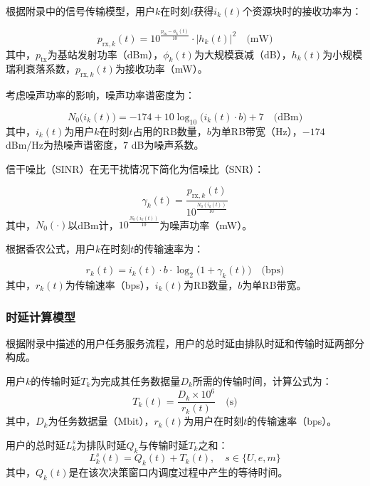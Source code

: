 根据附录中的信号传输模型，用户$k$在时刻$t$获得$i_k(t)$个资源块时的接收功率为：

\begin{equation}
p_{\text{rx},k}(t) = 10^{\frac{p_{\text{tx}} - \phi_k(t)}{10}} \cdot |h_k(t)|^2 \quad \text{(mW)}
\end{equation}
其中，$p_{\text{tx}}$为基站发射功率（dBm），$\phi_k(t)$为大规模衰减（dB），$h_k(t)$为小规模瑞利衰落系数，$p_{\text{rx},k}(t)$为接收功率（mW）。

考虑噪声功率的影响，噪声功率谱密度为：

\begin{equation}
N_0\big(i_k(t)\big) = -174 + 10\log_{10}\big(i_k(t) \cdot b\big) + 7 \quad \text{(dBm)}
\end{equation}
其中，$i_k(t)$为用户$k$在时刻$t$占用的RB数量，$b$为单RB带宽（Hz），$-174$ dBm/Hz为热噪声谱密度，$7$ dB为噪声系数。

信干噪比（SINR）在无干扰情况下简化为信噪比（SNR）：

\begin{equation}
\gamma_k(t) = \frac{p_{\text{rx},k}(t)}{10^{\frac{N_0\left(i_k(t)\right)}{10}}}
\end{equation}
其中，$N_0(\cdot)$以dBm计，$10^{\frac{N_0\left(i_k(t)\right)}{10}}$为噪声功率（mW）。

根据香农公式，用户$k$在时刻$t$的传输速率为：

\begin{equation}
r_k(t) = i_k(t) \cdot b \cdot \log_2\big(1 + \gamma_k(t)\big) \quad \text{(bps)}
\end{equation}
其中，$r_k(t)$为传输速率（bps），$i_k(t)$为RB数量，$b$为单RB带宽。

\subsubsection{时延计算模型}
根据附录中描述的用户任务服务流程，用户的总时延由排队时延和传输时延两部分构成。

用户$k$的传输时延$T_k$为完成其任务数据量$D_k$所需的传输时间，计算公式为：
\begin{equation}
T_k(t) = \frac{D_k \times 10^6}{r_k(t)} \quad \text{(s)}
\end{equation}
其中，$D_k$为任务数据量（Mbit），$r_k(t)$为用户在时刻$t$的传输速率（bps）。

用户的总时延$L_k^s$为排队时延$Q_k$与传输时延$T_k$之和：
\begin{equation}
L_k^{s}(t) = Q_k(t) + T_k(t), \quad s \in \{U, e, m\}
\end{equation}
其中，$Q_k(t)$是在该次决策窗口内调度过程中产生的等待时间。

